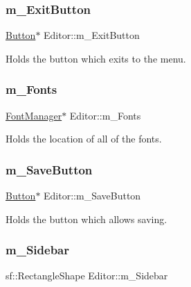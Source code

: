 \subsubsection{\texorpdfstring{m\+\_\+\+Exit\+Button}{m\_ExitButton}}
{\footnotesize\ttfamily \hyperlink{class_button}{Button}$\ast$ Editor\+::m\+\_\+\+Exit\+Button\hspace{0.3cm}{\ttfamily [private]}}



Holds the button which exits to the menu. 

\mbox{\label{class_editor_a836b960eec52b0362a95666cefbbb32f}} 
\subsubsection{\texorpdfstring{m\+\_\+\+Fonts}{m\_Fonts}}
{\footnotesize\ttfamily \hyperlink{class_font_manager}{Font\+Manager}$\ast$ Editor\+::m\+\_\+\+Fonts\hspace{0.3cm}{\ttfamily [private]}}



Holds the location of all of the fonts. 

\mbox{\label{class_editor_ab877f2e654748bb1fcc5b4208ca14d94}} 
\subsubsection{\texorpdfstring{m\+\_\+\+Save\+Button}{m\_SaveButton}}
{\footnotesize\ttfamily \hyperlink{class_button}{Button}$\ast$ Editor\+::m\+\_\+\+Save\+Button\hspace{0.3cm}{\ttfamily [private]}}



Holds the button which allows saving. 

\mbox{\label{class_editor_aa128967ccac6c69ff1a6cec3ddbe8c6f}} 
\subsubsection{\texorpdfstring{m\+\_\+\+Sidebar}{m\_Sidebar}}
{\footnotesize\ttfamily sf\+::\+Rectangle\+Shape Editor\+::m\+\_\+\+Sidebar\hspace{0.3cm}{\ttfamily [private]}}



